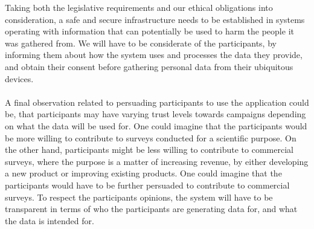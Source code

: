 Taking both the legislative requirements and our ethical obligations into consideration, a safe and secure infrastructure needs to be established in systems operating with information that can potentially be used to harm the people it was gathered from. We will have to be considerate of the participants, by informing them about how the system uses and processes the data they provide, and obtain their consent before gathering personal data from their ubiquitous devices.
\\\\
A final observation related to persuading participants to use the application could be, that participants may have varying trust levels towards campaigns depending on what the data will be used for. One could imagine that the participants would be more willing to contribute to surveys conducted for a scientific purpose. On the other hand, participants might be less willing to contribute to commercial surveys, where the purpose is a matter of increasing revenue, by either developing a new product or improving existing products. One could imagine that the participants would have to be further persuaded to contribute to commercial surveys. To respect the participants opinions, the system will have to be transparent in terms of who the participants are generating data for, and what the data is intended for.